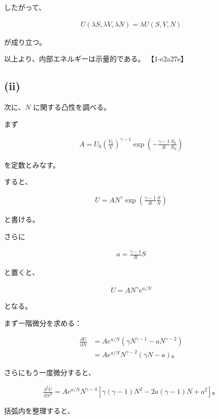 \documentclass[platex,dvipdfmx,a4paper]{jsarticle}
\begin{document}
したがって、

\begin{align*}
U(\lambda S,\lambda V,\lambda N)
=
\lambda U(S,V,N)
\end{align*}

が成り立つ。

以上より、内部エネルギーは示量的である。 【1-e2a27e】

\subsection{(ii)}

次に、$N$ に関する凸性を調べる。

まず

\begin{align*}
A
=
U_0
\left(
\frac{V_0}{V}
\right)^{\gamma-1}
\exp\left(
-\frac{\gamma-1}{R}
\frac{S_0}{N_0}
\right)
\end{align*}

を定数とみなす。

すると、

\begin{align*}
U
=
A
N^\gamma
\exp\left(
\frac{\gamma-1}{R}\frac{S}{N}
\right)
\end{align*}

と書ける。

さらに

\begin{align*}
a=\frac{\gamma-1}{R}S
\end{align*}

と置くと、

\begin{align*}
U
=
AN^\gamma e^{a/N}
\end{align*}

となる。

まず一階微分を求める：

\begin{align*}
\frac{\partial U}{\partial N}
&=
A e^{a/N}
\left(
\gamma N^{\gamma-1}
-aN^{\gamma-2}
\right) \\
&=
Ae^{a/N}
N^{\gamma-2}
(\gamma N-a)。
\end{align*}

さらにもう一度微分すると、

\begin{align*}
\frac{\partial^2U}{\partial N^2}
=
Ae^{a/N}
N^{\gamma-4}
\left[
\gamma(\gamma-1)N^2
-2a(\gamma-1)N
+a^2
\right]。
\end{align*}

括弧内を整理すると、
\end{document}
